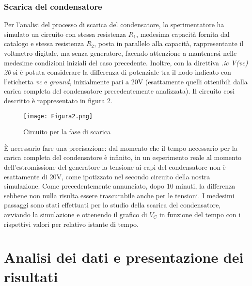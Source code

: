 \documentclass{article}
\begin{document}
\subsubsection{Scarica del condensatore}
Per l'analisi del processo di scarica del condensatore, lo sperimentatore ha simulato un circuito con stessa resistenza $R_1$, medesima capacità fornita dal catalogo e stessa resistenza $R_2$, posta in parallelo alla capacità, rappresentante il voltmetro digitale, ma senza generatore, facendo attenzione a mantenersi nelle medesime condizioni iniziali del caso precedente. Inoltre, con la direttiva \emph{.ic V(vc) 20} si è potuta considerare la differenza di potenziale tra il nodo indicato con l’etichetta \emph{vc} e \emph{ground}, inizialmente pari a 20V (esattamente quelli ottenibili dalla carica completa del condensatore precedentemente analizzata). Il circuito così descritto è rappresentato in figura 2.
\begin{figure}
    \centering
    \texttt{[image: Figura2.png]}
    \caption{Circuito per la fase di scarica}
    \label{figura2}
\end{figure}
È necessario fare una precisazione:  dal momento che il tempo necessario per la carica completa del condensatore è infinito, in un esperimento reale al momento dell’estromissione del generatore la tensione ai capi del condensatore non è esattamente di 20V, come ipotizzato nel secondo circuito della nostra simulazione. Come precedentemente annunciato, dopo 10 minuti, la differenza sebbene non nulla risulta essere trascurabile anche per le tensioni.
I medesimi passaggi sono stati effettuati per lo studio della scarica del condensatore, avviando la simulazione e ottenendo il grafico di $V_C$ in funzione del tempo con i rispettivi valori per relativo istante di tempo.

\section{Analisi dei dati e presentazione dei risultati}
\end{document}
